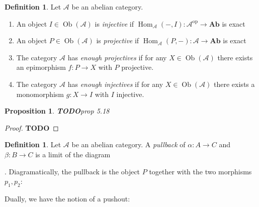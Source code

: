 \documentclass{article}
\newcommand{\op}{\mathrm{op}}
\newcommand{\Acat}{\mathcal{A}}
\newcommand{\Ab}{\mathbf{Ab}}
\DeclareMathOperator{\Ob}{Ob}
\DeclareMathOperator{\Hom}{Hom}
\newcommand{\todo}{\textbf{TODO}}
\theoremstyle{plain}
\newtheorem{proposition}[theorem]{Proposition}
\theoremstyle{definition}
\newtheorem{definition}[theorem]{Definition}
\theoremstyle{remark}
\begin{document}
\begin{definition}
    Let $\Acat$ be an abelian category.
    \begin{enumerate}
        \item An object $I \in \Ob(\Acat)$ is \emph{injective} if $\Hom_\Acat(-,I) : \Acat^\op \to \Ab$ is exact
        \item An object $P \in \Ob(\Acat)$ is \emph{projective} if $\Hom_\Acat(P,-) : \Acat \to \Ab$ is exact
        \item The category $\Acat$ has \emph{enough projectives} if for any $X \in \Ob(\Acat)$ there exists an epimorphism $f : P \to X$ with $P$ projective.
        \item The category $\Acat$ has \emph{enough injectives} if for any $X \in \Ob(\Acat)$ there exists a monomorphism $g : X \to I$ with $I$ injective.
    \end{enumerate}
\end{definition}

\begin{proposition}
    \todo prop 5.18
\end{proposition}

\begin{proof}
    \todo
\end{proof}

\begin{definition}
    Let $\Acat$ be an abelian category. A \emph{pullback} of $\alpha : A \to C$ and $\beta : B \to C$ is a limit of the diagram 
    . Diagramatically, the pullback is the object $P$ together with the two morphisms $p_1,p_2$:
    \begin{center}
    \end{center}
    Dually, we have the notion of a pushout:
    \begin{center}
    \end{center}
\end{definition}
\end{document}

